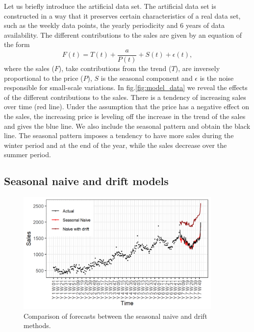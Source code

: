 \documentclass[12pt, letterpaper]{article}\usepackage[]{graphicx}\usepackage[]{color}
\begin{document}
Let us briefly introduce the artificial data set. The artificial data set is constructed in a way that it preserves certain characteristics of a real data set, such as the weekly data points, the yearly periodicity and 6 years of data availability. The different contributions to the sales are given by an equation of the form
\begin{equation}
F(t) = T(t) + \frac{a}{P(t)} + S(t) + \epsilon(t) , 
\label{eq:data_model}
\end{equation}
where the sales ($F$), take contributions from the trend ($T$), are inversely proportional to the price ($P$), $S$ is the seasonal component and $\epsilon$ is the noise responsible for small-scale variations.
In fig.\ref{fig:model_data} we reveal the effects of the different contributions to the sales. There is a tendency of increasing sales over time (red line). Under the assumption that the price has a negative effect on the sales, the increasing price is leveling off the increase in the trend of the sales and gives the blue line. We also include the seasonal pattern and obtain the black line. The seasonal pattern imposes a tendency to have more sales during the winter period and at the end of the year, while the sales decrease over the summer period.   

\subsection{Seasonal naive and drift models}

\begin{figure}[h!]
\centering
\includegraphics[width = 0.9\textwidth]{"figures/naive.png"}
\caption{Comparison of forecasts between the seasonal naive and drift methods.}
\label{fig:naive}
\end{figure}
\end{document}
